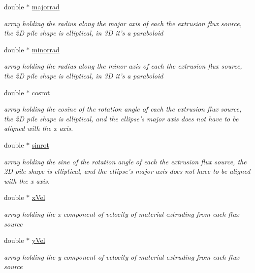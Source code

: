 \begin{CompactItemize}
double $\ast$ \hyperlink{structFluxProps_o6}{majorrad}
\begin{CompactList}\small\item\em array holding the radius along the major axis of each the extrusion flux source, the 2D pile shape is elliptical, in 3D it's a paraboloid \item\end{CompactList}\item 
double $\ast$ \hyperlink{structFluxProps_o7}{minorrad}
\begin{CompactList}\small\item\em array holding the radius along the minor axis of each the extrusion flux source, the 2D pile shape is elliptical, in 3D it's a paraboloid \item\end{CompactList}\item 
double $\ast$ \hyperlink{structFluxProps_o8}{cosrot}
\begin{CompactList}\small\item\em array holding the cosine of the rotation angle of each the extrusion flux source, the 2D pile shape is elliptical, and the ellipse's major axis does not have to be aligned with the x axis. \item\end{CompactList}\item 
double $\ast$ \hyperlink{structFluxProps_o9}{sinrot}
\begin{CompactList}\small\item\em array holding the sine of the rotation angle of each the extrusion flux source, the 2D pile shape is elliptical, and the ellipse's major axis does not have to be aligned with the x axis. \item\end{CompactList}\item 
double $\ast$ \hyperlink{structFluxProps_o10}{x\-Vel}
\begin{CompactList}\small\item\em array holding the x component of velocity of material extruding from each flux source \item\end{CompactList}\item 
double $\ast$ \hyperlink{structFluxProps_o11}{y\-Vel}
\begin{CompactList}\small\item\em array holding the y component of velocity of material extruding from each flux source \item\end{CompactList}\end{CompactItemize}


